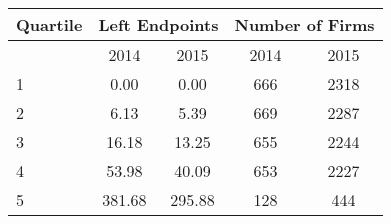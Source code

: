 \begin{tabular}{lcccc} \toprule Quartile & \multicolumn{2}{c}{Left Endpoints} & \multicolumn{2}{c}{Number of Firms}  \\ \midrule
& 2014 & 2015 & 2014 & 2015  \\ \midrule
1           &        0.00&        0.00&         666&        2318\\
2           &        6.13&        5.39&         669&        2287\\
3           &       16.18&       13.25&         655&        2244\\
4           &       53.98&       40.09&         653&        2227\\
5           &      381.68&      295.88&         128&         444\\
 \bottomrule \end{tabular}
